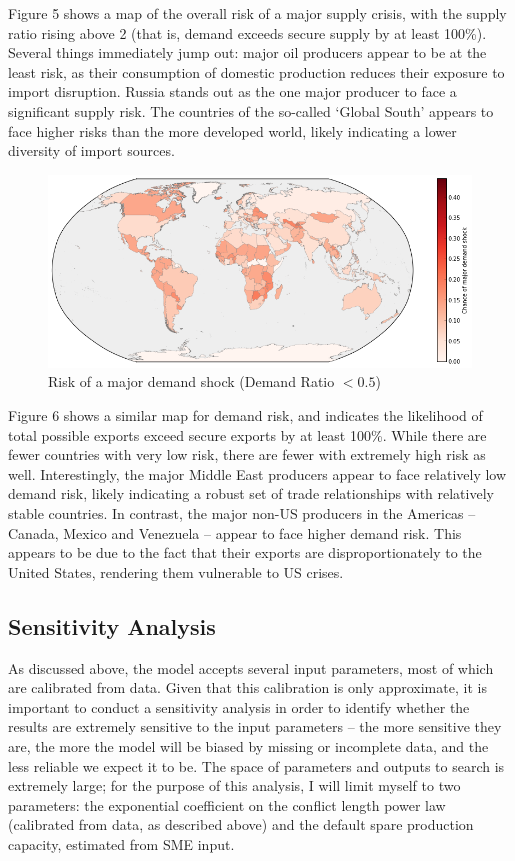 \documentclass{llncs}
\begin{document}
Figure 5 shows a map of the overall risk of a major supply crisis, with the supply ratio rising above 2 (that is, demand exceeds secure supply by at least 100\%). Several things immediately jump out: major oil producers appear to be at the least risk, as their consumption of domestic production reduces their exposure to import disruption. Russia stands out as the one major producer to face a significant supply risk. The countries of the so-called `Global South' appears to face higher risks than the more developed world, likely indicating a lower diversity of import sources.

\begin{figure}[h!]
	\centering
	\includegraphics[width=\textwidth]{../Graphics/DemandShockMap}
	\caption{Risk of a major demand shock (Demand Ratio $<0.5$)}

\end{figure}

Figure 6 shows a similar map for demand risk, and indicates the likelihood of total possible exports exceed secure exports by at least 100\%. While there are fewer countries with very low risk, there are fewer with extremely high risk as well. Interestingly, the major Middle East producers appear to face relatively low demand risk, likely indicating a robust set of trade relationships with relatively stable countries. In contrast, the major non-US producers in the Americas -- Canada, Mexico and Venezuela -- appear to face higher demand risk. This appears to be due to the fact that their exports are disproportionately to the United States, rendering them vulnerable to US crises.

\subsection{Sensitivity Analysis}

As discussed above, the model accepts several input parameters, most of which are calibrated from data. Given that this calibration is only approximate, it is important to conduct a sensitivity analysis in order to identify whether the results are extremely sensitive to the input parameters -- the more sensitive they are, the more the model will be biased by missing or incomplete data, and the less reliable we expect it to be. The space of parameters and outputs to search is extremely large; for the purpose of this analysis, I will limit myself to two parameters: the exponential coefficient on the conflict length power law (calibrated from data, as described above) and the default spare production capacity, estimated from SME input.
\end{document}
